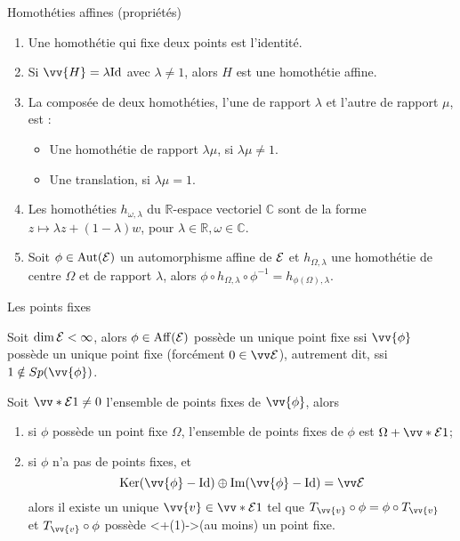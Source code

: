 \documentclass[bigger]{m53beamer}
\begin{document}
  \begin{frame}{Homothéties affines (propriétés)}
    \begin{enumerate}[<+(1)->]
      \item Une homothétie qui fixe deux points est l'identité.
      \item Si $\vv{H}=\lambda\id$ avec $\lambda\neq1$, alors $H$ est une homothétie affine.
      \item La composée de deux homothéties, l'une de rapport $\lambda$ et l'autre de rapport $\mu$, est :
      \begin{itemize}[<+(1)->]
        \item Une homothétie de rapport $\lambda\mu$, si $\lambda\mu \neq 1$.
        \item Une translation, si $\lambda\mu=1$.
      \end{itemize}
      \item Les homothéties $h_{\omega,\lambda}$ du $\mathbb{R}$-espace vectoriel $\mathbb{C}$ sont de la forme $z \mapsto \lambda z + (1-\lambda)w$, pour $\lambda \in \mathbb{R}, \omega \in \mathbb{C}$.
      \item Soit $\phi \in \operatorname{Aut}(\mathcal{E})$ un automorphisme affine de $\mathcal{E}$ et $h_{\Omega,\lambda}$ une homothétie de centre $\Omega$ et de rapport $\lambda$, alors $\phi\circ h_{\Omega,\lambda}\circ\phi^{-1}=h_{\phi(\Omega),\lambda}$.
    \end{enumerate}
  \end{frame}
  \begin{frame}{Les points fixes}
    \begin{proposition}
      Soit $\dim \mathcal{E} < \infty$, alors $\phi\in\operatorname{Aff}(\mathcal{E})$ possède un unique point fixe ssi $\vv{\phi}$ possède un unique point fixe (forcément $0\in\ev{E}$)\pause, autrement dit, ssi $1 \notin Sp(\vv{\phi})$.
    \end{proposition}\pause
    \begin{proposition}
      Soit $\vv*{\ens{E}}{1} \neq 0$ l'ensemble de points fixes de $\vv{\phi}$, alors
      \begin{enumerate}[<+(1)->]
        \item si $\phi$ possède un point fixe $\Omega$, l'ensemble de points fixes de $\phi$ est $\Omega+\vv*{\ens{E}}{1}$;
        \item si $\phi$ n'a pas de points fixes\pause, et
          $$
            \ker(\vv{\phi}-\id) \oplus \im(\vv{\phi}-\id) = \ev{E}
          $$\pause
        alors il existe un unique $\vv{v}\in\vv*{\ens{E}}{1}$ tel que $T_{\vv{v}}\circ\phi=\phi\circ T_{\vv{v}}$\pause\\
        et $T_{\vv{v}}\circ\phi$ possède \uncover<+(1)->{(au moins)} un point fixe.
      \end{enumerate}
    \end{proposition}
  \end{frame}
\end{document}
